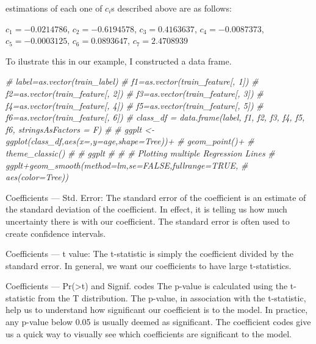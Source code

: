 \documentclass[
]{article}
\newenvironment{Shaded}{\begin{snugshade}}{\end{snugshade}}
\newcommand{\CommentTok}[1]{\textcolor[rgb]{0.56,0.35,0.01}{\textit{#1}}}
\begin{document}
estimations of each one of \(c_i\)s described above are as follows:

\(c_1=-0.0214786\), \(c_2=-0.6194578\), \(c_3=0.4163637\),
\(c_4=-0.0087373\), \(c_5=-0.0003125\), \(c_6=0.0893647\),
\(c_7=2.4708939\)

To ilustrate this in our example, I constructed a data frame.

\begin{Shaded}
\begin{Highlighting}[]
\CommentTok{\# label=as.vector(train\_label)}
\CommentTok{\# f1=as.vector(train\_feature[, 1])}
\CommentTok{\# f2=as.vector(train\_feature[, 2])}
\CommentTok{\# f3=as.vector(train\_feature[, 3])}
\CommentTok{\# f4=as.vector(train\_feature[, 4])}
\CommentTok{\# f5=as.vector(train\_feature[, 5])}
\CommentTok{\# f6=as.vector(train\_feature[, 6])}
\CommentTok{\# class\_df = data.frame(label, f1, f2, f3, f4, f5, f6, stringsAsFactors = F) }
\CommentTok{\# }
\CommentTok{\# ggplt \textless{}{-} ggplot(class\_df,aes(x=,y=age,shape=Tree))+}
\CommentTok{\#          geom\_point()+}
\CommentTok{\#          theme\_classic()}
\CommentTok{\#   }
\CommentTok{\# ggplt}
\CommentTok{\#   }
\CommentTok{\# \# Plotting multiple Regression Lines}
\CommentTok{\# ggplt+geom\_smooth(method=lm,se=FALSE,fullrange=TRUE,}
\CommentTok{\#                   aes(color=Tree))}
\end{Highlighting}
\end{Shaded}

Coefficients --- Std. Error: The standard error of the coefficient is an
estimate of the standard deviation of the coefficient. In effect, it is
telling us how much uncertainty there is with our coefficient. The
standard error is often used to create confidence intervals.

Coefficients --- t value: The t-statistic is simply the coefficient
divided by the standard error. In general, we want our coefficients to
have large t-statistics.

Coefficients --- Pr(\textgreater\textbar t\textbar) and Signif. codes
The p-value is calculated using the t-statistic from the T distribution.
The p-value, in association with the t-statistic, help us to understand
how significant our coefficient is to the model. In practice, any
p-value below 0.05 is usually deemed as significant. The coefficient
codes give us a quick way to visually see which coefficients are
significant to the model.
\end{document}

